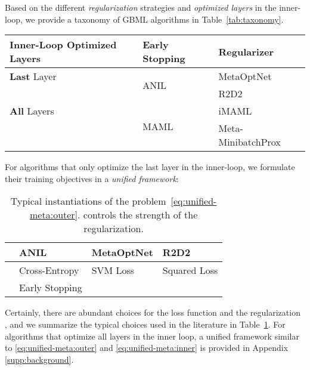 \documentclass{article}
\begin{document}
Based on the different \textit{regularization} strategies and \textit{optimized layers} in the inner-loop, we provide a taxonomy of GBML algorithms in Table~\ref{tab:taxonomy}.
\begin{table*}[tb]
    \centering
    \caption{A taxonomy of gradient-based meta-learning algorithms based on the algorithmic design of Eq.~\eqref{eq:prelim:anil-no-split:inner-loop}.}
    \label{tab:taxonomy}
    \vspace{+5pt}
    \begin{tabular}{l|*2l}\toprule
    Inner-Loop Optimized Layers &  \textbf{Early Stopping} & \textbf{ Regularizer}\\\midrule
    \textbf{Last} Layer  &  \multirow{2}{*}{ANIL \citep{raghu2019rapid}} & MetaOptNet \citep{metaOptNet} \\
                         &                                               & R2D2 \citep{r2d2} \\\midrule
    \textbf{All} Layers  &  \multirow{2}{*}{MAML \citep{maml}} & iMAML \citep{imaml} \\
                        &                                            & Meta-MinibatchProx \citep{zhou2019efficient}\\\bottomrule
    \end{tabular}
\end{table*}

For algorithms that only optimize the last layer in the inner-loop, we formulate their training objectives in a \textit{unified framework}:

\begin{table}[tb]
\vspace*{-1em}
\centering
\caption{Typical instantiations of the problem~\eqref{eq:unified-meta:outer}.  controls the strength of the regularization.}
\label{tab:instan}
\vspace{+5pt}
\begin{tabular}{*4l}
\toprule
              & ANIL & MetaOptNet         & R2D2               \\
\midrule
        & Cross-Entropy & SVM Loss            & Squared Loss          \\
\midrule
 & Early Stopping &  & \\
\bottomrule
\end{tabular}
\end{table}

Certainly, there are abundant choices for the loss function  and the regularization , and we summarize the typical choices used in the literature in Table~\ref{tab:instan}. For algorithms that optimize all layers in the inner loop, a unified framework similar to \eqref{eq:unified-meta:outer} and \eqref{eq:unified-meta:inner} is provided in Appendix \ref{supp:background}.
\end{document}
